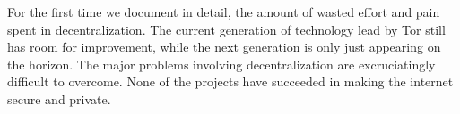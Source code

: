 \documentclass[12pt,journal,compsoc]{IEEEtran}
\begin{document}
	For the first time we document in detail, the amount of wasted effort and pain spent in decentralization. The current generation of technology lead by Tor still has room for improvement, while the next generation is only just appearing on the horizon. The major problems involving decentralization are excruciatingly difficult to overcome. None of the projects have succeeded in making the internet secure and private.



\end{document}
